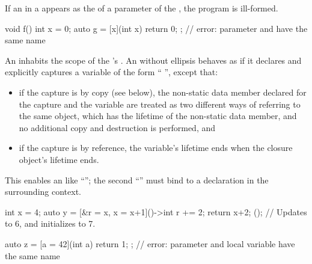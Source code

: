 \pnum
If an  in a  appears
as the  of a parameter of
the  ,
the program is ill-formed.
\begin{example}
\begin{codeblock}
void f() {
  int x = 0;
  auto g = [x](int x) { return 0; };    // error: parameter and  have the same name
}
\end{codeblock}
\end{example}

\pnum
An  inhabits the scope of
the 's .
An  without ellipsis
behaves as if it declares and explicitly captures a variable of
the form ``  \tcode{;}'', except that:
\begin{itemize}
\item if the capture is by copy (see below), the non-static data member
declared for the capture and the variable are treated as two different ways
of referring to the same object, which has the lifetime of the non-static
data member, and no additional copy and destruction is performed, and
\item if the capture is by reference, the variable's lifetime ends when the
closure object's lifetime ends.
\end{itemize}
\begin{note}
This enables an  like
``''; the second ``'' must bind to a
declaration in the surrounding context.
\end{note}
\begin{example}
\begin{codeblock}
int x = 4;
auto y = [&r = x, x = x+1]()->int {
            r += 2;
            return x+2;
         }();                               // Updates  to 6, and initializes  to 7.

auto z = [a = 42](int a) { return 1; };     // error: parameter and local variable have the same name
\end{codeblock}
\end{example}

